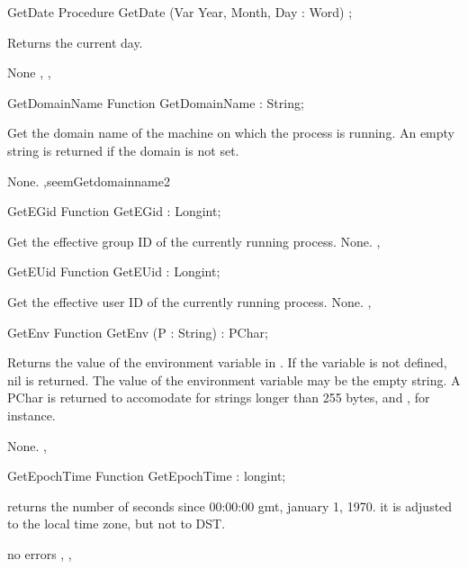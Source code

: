 \begin{procedure}{GetDate}
\Declaration
Procedure GetDate  (Var Year, Month, Day : Word) ;

\Description

Returns the current day.

\Errors
None
\SeeAlso
{}, ,  
\end{procedure}
\begin{function}{GetDomainName}
\Declaration
Function GetDomainName  : String;

\Description

Get the domain name of the machine on which the process is running.
An empty string is returned if the domain is not set.

\Errors
None.
\SeeAlso
 ,seem{Getdomainname}{2} 
\end{function}
\begin{function}{GetEGid}
\Declaration
Function GetEGid  : Longint;

\Description
 Get the effective group ID of the currently running process.
\Errors
None.
\SeeAlso
{},  
\end{function}
\begin{function}{GetEUid}
\Declaration
Function GetEUid  : Longint;

\Description
 Get the effective user ID of the currently running process.
\Errors
None.
\SeeAlso
{},  
\end{function}
\begin{function}{GetEnv}
\Declaration
Function GetEnv (P : String) : PChar;

\Description
Returns the value of the environment variable in . If the variable is
not defined, nil is returned. The value of the environment variable may be
the empty string.
A PChar is returned to accomodate for strings longer than 255 bytes,
 and , for instance.

\Errors
None.
\SeeAlso
{},  
\end{function}
\begin{function}{GetEpochTime}
\Declaration
Function GetEpochTime  : longint;

\Description

returns the number of seconds since 00:00:00 gmt, january 1, 1970.
it is adjusted to the local time zone, but not to DST.

\Errors
no errors
\SeeAlso
{}, , 
\end{function}
